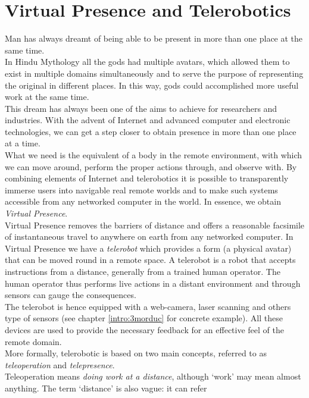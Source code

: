 \section{Virtual Presence and Telerobotics}
\label{intro:virtual_presence}

Man has always dreamt of being able to be present in more than
one place at the same time.
\\
In Hindu Mythology all the gods had multiple avatars, which
allowed them to exist in multiple domains simultaneously and to
serve the purpose of representing the original in different
places. In this way, gods could accomplished more useful work
at the same time. 
\\
This dream has always been one of the aims to achieve for 
researchers and industries. With the advent of Internet and
advanced computer and electronic technologies, we can get a
step closer to obtain presence in more than one place
at a time.
\\
What we need is the equivalent of a body in the remote environment,
with which we can move around, perform the proper actions through,
and observe with. By combining elements of Internet and
telerobotics it is possible to transparently immerse users into
navigable real remote worlds and to make such systems accessible
from any networked computer in the world. In essence, we obtain
\textit{Virtual Presence}.
\\
Virtual Presence removes the barriers of distance and offers a
reasonable facsimile of instantaneous travel to anywhere on earth
from any networked computer.
In Virtual Presence we have a \textit{telerobot} which provides a form
(a physical avatar) that can be moved round in a remote space.
A telerobot is a robot that accepts instructions from a distance,
generally from a trained human operator. The human operator thus
performs live actions in a distant environment and through sensors
can gauge the consequences.
\\
The telerobot is hence equipped with a web-camera, laser scanning and
others type of sensors (see chapter \ref{intro:3morduc} for \morduc{}
concrete example). All these devices are used to provide the
necessary feedback for an effective feel of the remote domain.
\\
More formally, telerobotic is based on two main concepts, referred to
as \textit{teleoperation} and \textit{telepresence}.
\\
Teleoperation means \textit{doing work at a distance}, although `work' may
mean almost anything. The term `distance' is also vague: it can refer
